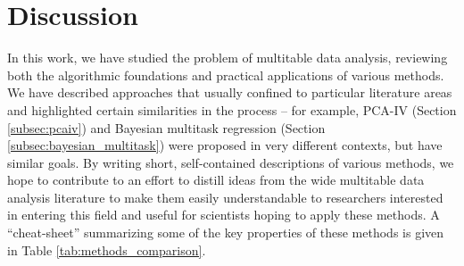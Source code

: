\documentclass[utf8]{frontiersFPHY} %
\begin{document}
\section{Discussion}
\label{sec:Discussion}

In this work, we have studied the problem of multitable data analysis, reviewing
both the algorithmic foundations and practical applications of various methods.
We have described approaches that usually confined to particular literature
areas and highlighted certain similarities in the process -- for example, PCA-IV
(Section \ref{subsec:pcaiv}) and Bayesian multitask regression (Section
\ref{subsec:bayesian_multitask}) were proposed in very different contexts, but
have similar goals. By writing short, self-contained descriptions of various
methods, we hope to contribute to an effort to distill ideas from the wide
multitable data analysis literature to make them easily understandable to
researchers interested in entering this field and useful for scientists hoping
to apply these methods. A ``cheat-sheet'' summarizing some of the key properties
of these methods is given in Table \ref{tab:methods_comparison}.
\end{document}
